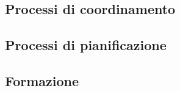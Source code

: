 \documentclass[../norme-di-progetto.tex]{subfiles}
\begin{document}
\subsection{Processi di coordinamento}

\subsection{Processi di pianificazione}

\subsection{Formazione}
\end{document}
